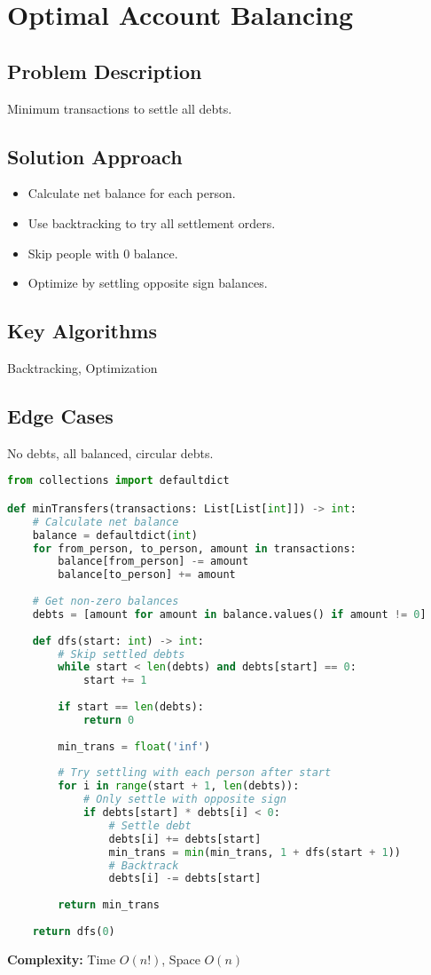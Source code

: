 \documentclass[10pt, a4paper]{article}
\begin{document}
\section{Optimal Account Balancing}
\subsection*{Problem Description}
Minimum transactions to settle all debts.

\subsection*{Solution Approach}
\begin{itemize}
    \item Calculate net balance for each person.
    \item Use backtracking to try all settlement orders.
    \item Skip people with 0 balance.
    \item Optimize by settling opposite sign balances.
\end{itemize}

\subsection*{Key Algorithms}
Backtracking, Optimization

\subsection*{Edge Cases}
No debts, all balanced, circular debts.

\begin{lstlisting}[language=Python]
from collections import defaultdict

def minTransfers(transactions: List[List[int]]) -> int:
    # Calculate net balance
    balance = defaultdict(int)
    for from_person, to_person, amount in transactions:
        balance[from_person] -= amount
        balance[to_person] += amount
    
    # Get non-zero balances
    debts = [amount for amount in balance.values() if amount != 0]
    
    def dfs(start: int) -> int:
        # Skip settled debts
        while start < len(debts) and debts[start] == 0:
            start += 1
        
        if start == len(debts):
            return 0
        
        min_trans = float('inf')
        
        # Try settling with each person after start
        for i in range(start + 1, len(debts)):
            # Only settle with opposite sign
            if debts[start] * debts[i] < 0:
                # Settle debt
                debts[i] += debts[start]
                min_trans = min(min_trans, 1 + dfs(start + 1))
                # Backtrack
                debts[i] -= debts[start]
        
        return min_trans
    
    return dfs(0)
\end{lstlisting}
\textbf{Complexity:} Time $O(n!)$, Space $O(n)$
\end{document}
